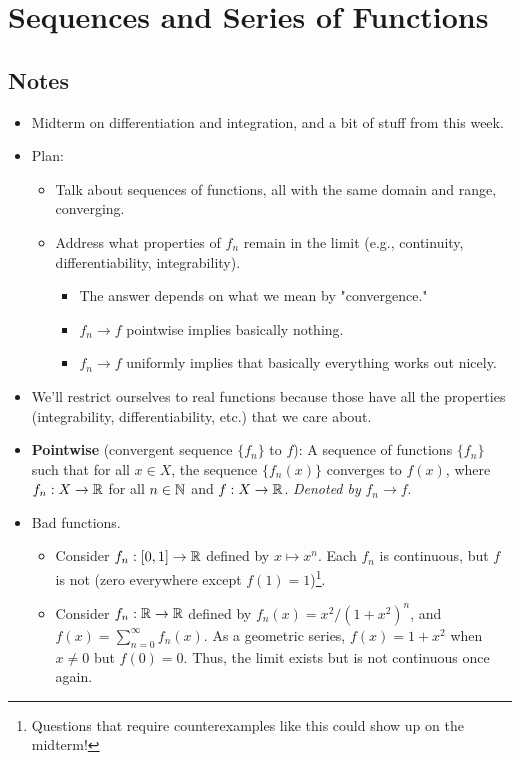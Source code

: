 \documentclass[../notes.tex]{subfiles}
\begin{document}
\chapter{Sequences and Series of Functions}
\section{Notes}
\begin{itemize}
    \item {}Midterm on differentiation and integration, and a bit of stuff from this week.
    \item Plan:
    \begin{itemize}
        \item Talk about sequences of functions, all with the same domain and range, converging.
        \item Address what properties of $f_n$ remain in the limit (e.g., continuity, differentiability, integrability).
        \begin{itemize}
            \item The answer depends on what we mean by "convergence."
            \item $f_n\to f$ pointwise implies basically nothing.
            \item $f_n\to f$ uniformly implies that basically everything works out nicely.
        \end{itemize}
    \end{itemize}
    \item We'll restrict ourselves to real functions because those have all the properties (integrability, differentiability, etc.) that we care about.
    \item \textbf{Pointwise} (convergent sequence $\{f_n\}$ to $f$): A sequence of functions $\{f_n\}$ such that for all $x\in X$, the sequence $\{f_n(x)\}$ converges to $f(x)$, where $f_n:X\to\mathbb{R}$ for all $n\in\mathbb{N}$ and $f:X\to\mathbb{R}$. \emph{Denoted by} $f_n\to f$.
    \item Bad functions.
    \begin{itemize}
        \item Consider $f_n:[0,1]\to\mathbb{R}$ defined by $x\mapsto x^n$. Each $f_n$ is continuous, but $f$ is not (zero everywhere except $f(1)=1$)\footnote{Questions that require counterexamples like this could show up on the midterm!}.
        \item Consider $f_n:\mathbb{R}\to\mathbb{R}$ defined by $f_n(x)=x^2/(1+x^2)^n$, and $f(x)=\sum_{n=0}^\infty f_n(x)$. As a geometric series, $f(x)=1+x^2$ when $x\neq 0$ but $f(0)=0$. Thus, the limit exists but is not continuous once again.

\end{itemize}
\end{itemize}
\end{document}
